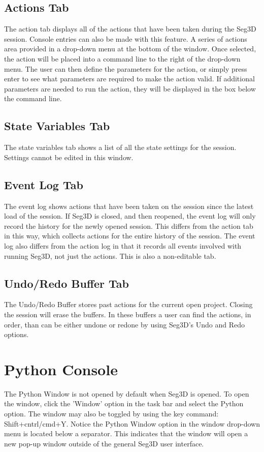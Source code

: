 \documentclass[fleqn,11pt,openany]{book}
\begin{document}
\subsection{Actions Tab}
The action tab displays all of the actions that have been taken during the Seg3D session.
Console entries can also be made with this feature.
A series of actions area provided in a drop-down menu at the bottom of the window.
Once selected, the action will be placed into a command line to the right of the drop-down menu.
The user can then define the parameters for the action, or simply press enter to see what parameters are required to make the action valid.
If additional parameters are needed to run the action, they will be displayed in the box below the command line.

\subsection{State Variables Tab}
The state variables tab  shows a list of all the state settings for the session.
Settings cannot be edited in this window.

\subsection{Event Log Tab}
The event log shows actions that have been taken on the session since the latest load of the session.
If Seg3D is closed, and then reopened, the event log will only record the history for the newly opened session.
This differs from the action tab in this way, which collects actions for the entire history of the session.
The event log also differs from the action log in that it records all events involved with running Seg3D, not just the actions.
This is also a non-editable tab.

\subsection{Undo/Redo Buffer Tab}
The Undo/Redo Buffer stores past actions for the current open project.
Closing the session will erase the buffers.
In these buffers a user can find the actions, in order, than can be either undone or redone by using Seg3D's Undo and Redo options.


\section{Python Console}
The Python Window is not opened by default when Seg3D is opened.  To open the window, click the 'Window' option in the task bar and select the Python option.  The window may also be toggled by using the key command: Shift+cntrl/cmd+Y.
Notice the Python Window option in the window drop-down menu is located below a separator.  
This indicates that the window will open a new pop-up window outside of the general Seg3D user interface.
\end{document}

